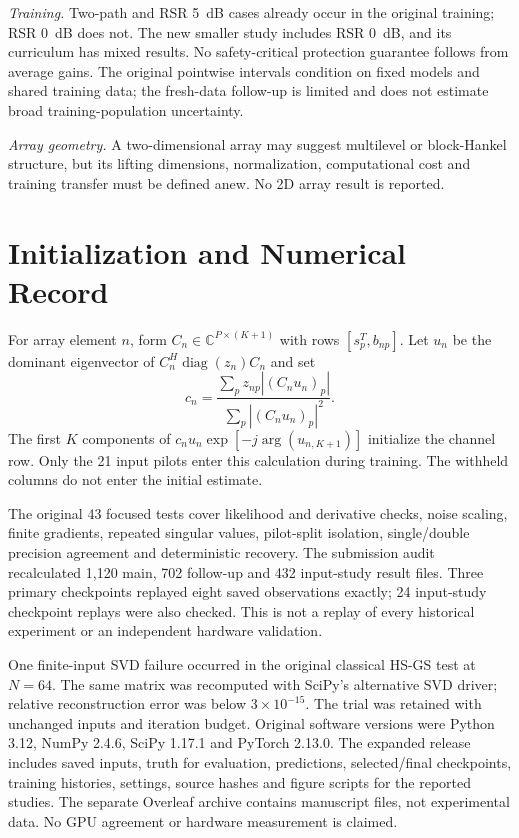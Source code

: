 \documentclass[journal]{IEEEtran}
\DeclareMathOperator{\diag}{diag}
\begin{document}
\textit{Training.} Two-path and RSR 5~dB cases already occur in the original
training; RSR 0~dB does not. The new smaller study includes RSR 0~dB,
and its curriculum has mixed results. No safety-critical protection
guarantee follows from average gains. The original pointwise
intervals condition on fixed models and shared training data; the
fresh-data follow-up is limited and does not estimate broad
training-population uncertainty.

\textit{Array geometry.} A two-dimensional array may suggest multilevel
or block-Hankel structure, but its lifting dimensions, normalization,
computational cost and training transfer must be defined anew. No 2D
array result is reported.

\section{Initialization and Numerical Record}
For array element $n$, form $C_n\in\mathbb C^{P\times(K+1)}$ with rows
$[s_p^T,b_{np}]$. Let $u_n$ be the dominant eigenvector of
$C_n^H\diag(z_n)C_n$ and set
\begin{equation}
 c_n=\frac{\sum_p z_{np}|(C_nu_n)_p|}{\sum_p|(C_nu_n)_p|^2}.
\end{equation}
The first $K$ components of $c_nu_n\exp[-j\arg(u_{n,K+1})]$ initialize
the channel row. Only the 21 input pilots enter this calculation during
training. The withheld columns do not enter the initial estimate.

The original 43 focused tests cover likelihood and derivative checks,
noise scaling, finite gradients, repeated singular values, pilot-split
isolation, single/double precision agreement and deterministic recovery.
The submission audit recalculated 1,120 main, 702 follow-up and 432
input-study result files. Three primary checkpoints replayed eight saved
observations exactly; 24 input-study checkpoint replays were also checked.
This is not a replay of every historical experiment or an independent
hardware validation.

One finite-input SVD failure occurred in the original classical HS-GS
test at $N=64$. The same matrix was recomputed with SciPy's alternative
SVD driver; relative reconstruction error was below $3\times10^{-15}$.
The trial was retained with unchanged inputs and iteration budget.
Original software versions were Python 3.12, NumPy 2.4.6, SciPy 1.17.1
and PyTorch 2.13.0. The expanded release includes saved inputs, truth
for evaluation, predictions, selected/final checkpoints, training histories,
settings, source hashes and figure scripts for the reported studies.
The separate Overleaf archive contains manuscript files, not experimental
data. No GPU agreement or hardware measurement is claimed.


\end{document}
